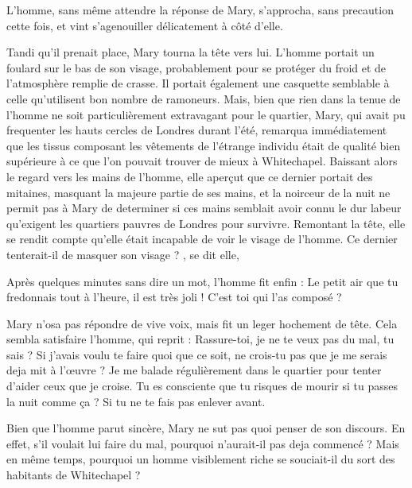 L'homme, sans même attendre la réponse de Mary, s'approcha, sans precaution cette fois, et vint s'agenouiller délicatement à côté d'elle.

Tandi qu'il prenait place, Mary tourna la tête vers lui.
L'homme portait un foulard sur le bas de son visage, probablement pour se protéger du froid et de l'atmosphère remplie de crasse.
Il portait également une casquette semblable à celle qu'utilisent bon nombre de ramoneurs.
Mais, bien que rien dans la tenue de l'homme ne soit particulièrement extravagant pour le quartier, Mary, qui avait pu frequenter les hauts cercles de Londres durant l'été, remarqua immédiatement que les tissus composant les vêtements de l'étrange individu était de qualité bien supérieure à ce que l'on pouvait trouver de mieux à Whitechapel.
Baissant alors le regard vers les mains de l'homme, elle aperçut que ce dernier portait des mitaines, masquant la majeure partie de ses mains, et la noirceur de la nuit ne permit pas à Mary de determiner si ces mains semblait avoir connu le dur labeur qu'exigent les quartiers pauvres de Londres pour survivre.
Remontant la tête, elle se rendit compte qu'elle était incapable de voir le visage de l'homme.
Ce dernier tenterait-il de masquer son visage ?
, se dit elle, 

Après quelques minutes sans dire un mot, l'homme fit enfin :
\rep Le petit air que tu fredonnais tout à l'heure, il est très joli !
C'est toi qui l'as composé ?

Mary n'osa pas répondre de vive voix, mais fit un leger hochement de tête.
Cela sembla satisfaire l'homme, qui reprit :
\rep Rassure-toi, je ne te veux pas du mal, tu sais ?
Si j'avais voulu te faire quoi que ce soit, ne crois-tu pas que je me serais deja mit à l'œuvre ?
Je me balade régulièrement dans le quartier pour tenter d'aider ceux que je croise.
Tu es consciente que tu risques de mourir si tu passes la nuit comme ça ?
Si tu ne te fais pas enlever avant.

Bien que l'homme parut sincère, Mary ne sut pas quoi penser de son discours.
En effet, s'il voulait lui faire du mal, pourquoi n'aurait-il pas deja commencé ?
Mais en même temps, pourquoi un homme visiblement riche se souciait-il du sort des habitants de Whitechapel ?

